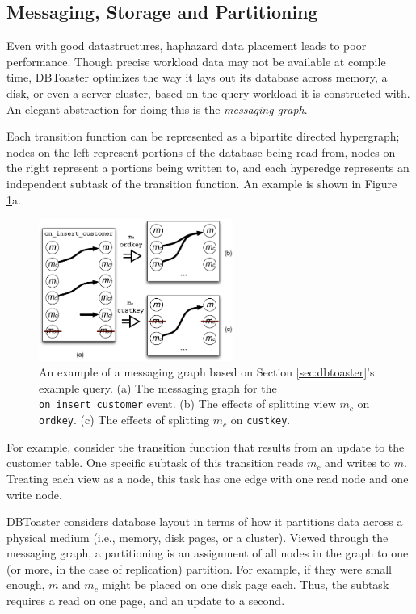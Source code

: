 \subsection{Messaging, Storage and Partitioning}
Even with good datastructures, haphazard data placement leads to poor performance.  Though precise workload data may not be available at compile time, DBToaster optimizes the way it lays out its database across memory, a disk, or even a server cluster, based on the query workload it is constructed with.  An elegant abstraction for doing this is the \textit{messaging graph}.

Each transition function can be represented as a bipartite directed hypergraph; nodes on the left represent portions of the database being read from, nodes on the right represent a portions being written to, and each hyperedge represents an independent subtask of the transition function.  An example is shown in Figure \ref{fig:diag:messagingGraph}a.

\begin{figure}
\begin{center}
\includegraphics[width=2.5in]{graphics/MessagingGraph}
\end{center}
\caption{An example of a messaging graph based on Section \ref{sec:dbtoaster}'s example query.  (a) The messaging graph for the \texttt{on\_insert\_customer} event.  (b) The effects of splitting view $m_c$ on \texttt{ordkey}.  (c) The effects of splitting $m_c$ on \texttt{custkey}.}
\label{fig:diag:messagingGraph}
\vspace*{-0.2in}
\end{figure}

For example, consider the transition function that results from an update to the customer table.  One specific subtask of this transition reads $m_c$ and writes to $m$.  Treating each view as a node, this task has one edge with one read node and one write node.  

DBToaster considers database layout in terms of how it partitions data across a physical medium (i.e., memory, disk pages, or a cluster).  Viewed through the messaging graph, a partitioning is an assignment of all nodes in the graph to one (or more, in the case of replication) partition.  For example, if they were small enough, $m$ and $m_c$ might be placed on one disk page each.  Thus, the subtask requires a read on one page, and an update to a second.


